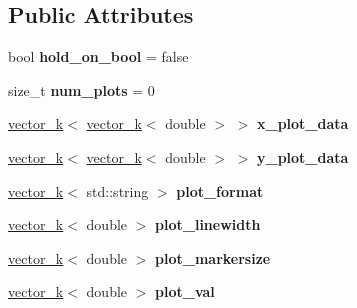 \subsection*{Public Attributes}
\begin{DoxyCompactItemize}
\item 
\hypertarget{classkeycpp_1_1_plots_afe961c1f35d88bc181bd426fc47ade00}{bool {\bfseries hold\-\_\-on\-\_\-bool} = false}\label{classkeycpp_1_1_plots_afe961c1f35d88bc181bd426fc47ade00}

\item 
\hypertarget{classkeycpp_1_1_plots_ad3b0aabd8ea6dc14a690fe6b1e37852d}{size\-\_\-t {\bfseries num\-\_\-plots} = 0}\label{classkeycpp_1_1_plots_ad3b0aabd8ea6dc14a690fe6b1e37852d}

\item 
\hypertarget{classkeycpp_1_1_plots_a9d1e2733700545d650240710449ca82c}{\hyperlink{classkeycpp_1_1vector__k}{vector\-\_\-k}$<$ \hyperlink{classkeycpp_1_1vector__k}{vector\-\_\-k}$<$ double $>$ $>$ {\bfseries x\-\_\-plot\-\_\-data}}\label{classkeycpp_1_1_plots_a9d1e2733700545d650240710449ca82c}

\item 
\hypertarget{classkeycpp_1_1_plots_ae50b52ddb8dd739b553f0488d0f89434}{\hyperlink{classkeycpp_1_1vector__k}{vector\-\_\-k}$<$ \hyperlink{classkeycpp_1_1vector__k}{vector\-\_\-k}$<$ double $>$ $>$ {\bfseries y\-\_\-plot\-\_\-data}}\label{classkeycpp_1_1_plots_ae50b52ddb8dd739b553f0488d0f89434}

\item 
\hypertarget{classkeycpp_1_1_plots_a8665d63b8f7098941f9c6e9369edae3c}{\hyperlink{classkeycpp_1_1vector__k}{vector\-\_\-k}$<$ std\-::string $>$ {\bfseries plot\-\_\-format}}\label{classkeycpp_1_1_plots_a8665d63b8f7098941f9c6e9369edae3c}

\item 
\hypertarget{classkeycpp_1_1_plots_a5229077ae64f278530c2c153c6925e7d}{\hyperlink{classkeycpp_1_1vector__k}{vector\-\_\-k}$<$ double $>$ {\bfseries plot\-\_\-linewidth}}\label{classkeycpp_1_1_plots_a5229077ae64f278530c2c153c6925e7d}

\item 
\hypertarget{classkeycpp_1_1_plots_a6875dffbe632094e898e907acfdf865d}{\hyperlink{classkeycpp_1_1vector__k}{vector\-\_\-k}$<$ double $>$ {\bfseries plot\-\_\-markersize}}\label{classkeycpp_1_1_plots_a6875dffbe632094e898e907acfdf865d}

\item 
\hypertarget{classkeycpp_1_1_plots_ab67ed9d8c321380f223baea8f05630ed}{\hyperlink{classkeycpp_1_1vector__k}{vector\-\_\-k}$<$ double $>$ {\bfseries plot\-\_\-val}}\label{classkeycpp_1_1_plots_ab67ed9d8c321380f223baea8f05630ed}


\end{DoxyCompactItemize}
